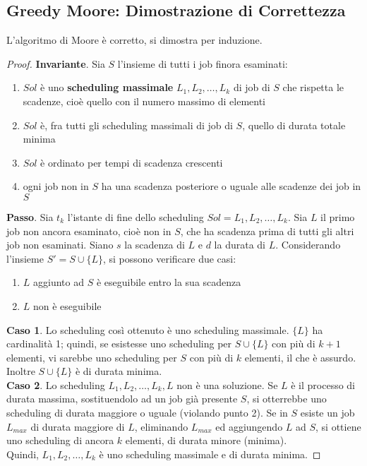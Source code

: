 \documentclass[11pt]{article}
\begin{document}
\subsection*{Greedy Moore: Dimostrazione di Correttezza}
L'algoritmo di Moore è corretto, si dimostra per induzione.
\begin{proof}
    \textbf{Invariante}. Sia $S$ l'insieme di tutti i job finora esaminati:
    \begin{enumerate}
        \item $Sol$ è uno \textbf{scheduling massimale} $L_1,L_2,\dots,L_k$ di job di $S$ che rispetta le scadenze, cioè 
        quello con il numero massimo di elementi 
        \item $Sol$ è, fra tutti gli scheduling massimali di job di $S$, quello di durata totale minima 
        \item $Sol$ è ordinato per tempi di scadenza crescenti
        \item ogni job non in $S$ ha una scadenza posteriore o uguale alle scadenze dei job in $S$ 
    \end{enumerate}
    \textbf{Passo}. Sia $t_k$ l'istante di fine dello scheduling $Sol=L_1,L_2,\dots,L_k$. Sia $L$ il primo job non ancora 
    esaminato, cioè non in $S$, che ha scadenza prima di tutti gli altri job non esaminati. Siano $s$ la scadenza di $L$ 
    e $d$ la durata di $L$. Considerando l'insieme $S'=S\cup \{L\}$, si possono verificare due casi:
    \begin{enumerate}
        \item $L$ aggiunto ad $S$ è eseguibile entro la sua scadenza 
        \item $L$ non è eseguibile
    \end{enumerate}
    \textbf{Caso 1}. Lo scheduling così ottenuto è uno scheduling massimale. $\{L\}$ ha cardinalità 1; quindi, se esistesse 
    uno scheduling per $S\cup \{L\}$ con più di $k+1$ elementi, vi sarebbe uno scheduling per $S$ con più di $k$ elementi,
    il che è assurdo. Inoltre $S\cup \{L\}$ è di durata minima.\\ 
    \textbf{Caso 2}. Lo scheduling $L_1,L_2,\dots,L_k,L$ non è una soluzione. Se $L$ è il processo di durata massima, sostituendolo 
    ad un job già presente $S$, si otterrebbe uno scheduling di durata maggiore o uguale (violando punto 2). Se in $S$ 
    esiste un job $L_{max}$ di durata maggiore di $L$, eliminando $L_{max}$ ed aggiungendo $L$ ad $S$, si ottiene uno 
    scheduling di ancora $k$ elementi, di durata minore (minima).\\
    Quindi, $L_1,L_2,\dots,L_k$ è uno scheduling massimale e di durata minima.
\end{proof}
\end{document}
